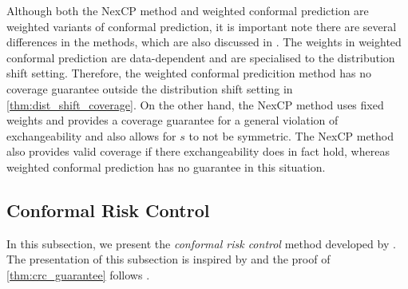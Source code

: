\documentclass[11pt, titlepage]{article} %
\numberwithin{equation}{section}
\theoremstyle{definition}
\numberwithin{theorem}{section}
\numberwithin{lemma}{section}
\numberwithin{corollary}{section}
\numberwithin{proposition}{section}
\numberwithin{definition}{section}
\numberwithin{remark}{section}
\begin{document}
\noindent
Although both the NexCP method and weighted conformal prediction are weighted variants of conformal prediction, it is important note there are several differences in the methods, which are also discussed in \cite{barber2023conformalbeyondexch}. The weights in weighted conformal prediction are data-dependent and are specialised to the distribution shift setting. Therefore, the weighted conformal predicition method has no coverage guarantee outside the distribution shift setting in \cref{thm:dist_shift_coverage}. On the other hand, the NexCP method uses fixed weights and provides a coverage guarantee for a general violation of exchangeability and also allows for \(s\) to not be symmetric. The NexCP method also provides valid coverage if there exchangeability does in fact hold, whereas weighted conformal prediction has no guarantee in this situation.

\subsection{Conformal Risk Control}
\label{subsec:crc}

In this subsection, we present the \textit{conformal risk control} method developed by \cite{angelopoulos2024riskcontrol}. The presentation of this subsection is inspired by \cite{angelopoulos2024riskcontrol,angelopoulos2024theoreticalfoundationsconformalprediction} and the proof of \cref{thm:crc_guarantee} follows \cite{angelopoulos2024riskcontrol}. \vskip5pt
\end{document}
